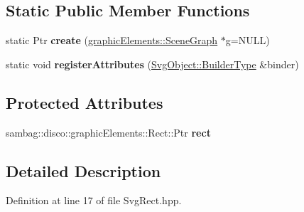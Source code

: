 \subsection*{Static Public Member Functions}
\begin{DoxyCompactItemize}
\item 
\hypertarget{classsambag_1_1disco_1_1svg_1_1_svg_rect_a6fee73a3794e3bd717246194b27749bf}{
static Ptr {\bfseries create} (\hyperlink{classsambag_1_1disco_1_1graphic_elements_1_1_scene_graph}{graphicElements::SceneGraph} $\ast$g=NULL)}
\label{classsambag_1_1disco_1_1svg_1_1_svg_rect_a6fee73a3794e3bd717246194b27749bf}

\item 
\hypertarget{classsambag_1_1disco_1_1svg_1_1_svg_rect_af04b290fa1361836ebe9eb1b7477bbe3}{
static void {\bfseries registerAttributes} (\hyperlink{classsambag_1_1xml_1_1_x_m_l2_object}{SvgObject::BuilderType} \&binder)}
\label{classsambag_1_1disco_1_1svg_1_1_svg_rect_af04b290fa1361836ebe9eb1b7477bbe3}

\end{DoxyCompactItemize}
\subsection*{Protected Attributes}
\begin{DoxyCompactItemize}
\item 
\hypertarget{classsambag_1_1disco_1_1svg_1_1_svg_rect_a30b08002c5cfeef24733fa07c9897e6d}{
sambag::disco::graphicElements::Rect::Ptr {\bfseries rect}}
\label{classsambag_1_1disco_1_1svg_1_1_svg_rect_a30b08002c5cfeef24733fa07c9897e6d}

\end{DoxyCompactItemize}


\subsection{Detailed Description}


Definition at line 17 of file SvgRect.hpp.



